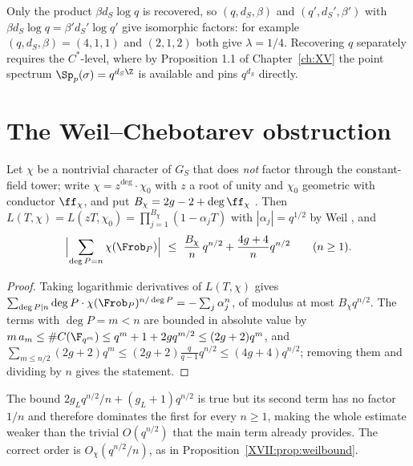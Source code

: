 \begin{remark}\label{XVII:rem:ambiguity}
Only the product $\beta d_S\log q$ is recovered, so $(q,d_S,\beta)$ and
$(q',d_S',\beta')$ with $\beta d_S\log q=\beta'd_S'\log q'$ give isomorphic factors: for
example $(q,d_S,\beta)=(4,1,1)$ and $(2,1,2)$ both give $\lambda=1/4$. Recovering $q$
separately requires the $C^*$-level, where by Proposition 1.1 of Chapter~\ref{ch:XV} the point spectrum
$\Sp_p(\sigma)=q^{d_S\Z}$ is available and pins $q^{d_S}$ directly.
\end{remark}

\section{The Weil--Chebotarev obstruction}

\begin{proposition}\label{XVII:prop:weilbound}
Let $\chi$ be a nontrivial character of $G_S$ that does \emph{not} factor through the
constant-field tower; write $\chi=z^{\deg}\cdot\chi_0$ with $z$ a root of unity and $\chi_0$
geometric with conductor $\ff_\chi$, and put $B_\chi=2g-2+\deg\ff_\chi$
\cite{Stichtenoth}. Then $L(T,\chi)=L(zT,\chi_0)=\prod_{j=1}^{B_\chi}(1-\alpha_jT)$ with
$|\alpha_j|=q^{1/2}$ by Weil \cite{Weil}, and
\[
\Bigl|\sum_{\deg P=n}\chi(\Frob_P)\Bigr|\ \le\ \frac{B_\chi}{n}\,q^{n/2}+\frac{4g+4}{n}q^{n/2}
\qquad(n\ge1).
\]
\end{proposition}

\begin{proof}
Taking logarithmic derivatives of $L(T,\chi)$ gives
$\sum_{\deg P\mid n}\deg P\cdot\chi(\Frob_P)^{n/\deg P}=-\sum_j\alpha_j^n$, of modulus at
most $B_\chi q^{n/2}$. The terms with $\deg P=m<n$ are bounded in absolute value by
$m\,a_m\le\#C(\F_{q^m})\le q^m+1+2gq^{m/2}\le(2g+2)q^m$, and
$\sum_{m\le n/2}(2g+2)q^m\le(2g+2)\tfrac{q}{q-1}q^{n/2}\le(4g+4)q^{n/2}$; removing them and
dividing by $n$ gives the statement.
\end{proof}

\begin{remark}\label{XVII:rem:proposedbound}
The bound $2g_Lq^{n/2}/n+(g_L+1)q^{n/2}$ is true but its second term has no factor $1/n$ and
therefore dominates the first for every $n\ge1$, making the whole estimate weaker than the
trivial $O(q^{n/2})$ that the main term already provides. The correct order is
$O_\chi(q^{n/2}/n)$, as in Proposition~\ref{XVII:prop:weilbound}.
\end{remark}


